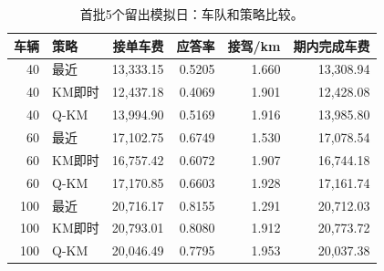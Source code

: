 \begin{table}[htbp]\centering\small
\caption{首批5个留出模拟日：车队和策略比较。}\label{tab:rlfleet}
\begin{tabularx}{\linewidth}{rlrrrr}\toprule
车辆 & 策略 & 接单车费 & 应答率 & 接驾/km & 期内完成车费\\\midrule
40 & 最近 & 13,333.15 & 0.5205 & 1.660 & 13,308.94\\
40 & KM即时 & 12,437.18 & 0.4069 & 1.901 & 12,428.08\\
40 & Q-KM & 13,994.90 & 0.5169 & 1.916 & 13,985.80\\
60 & 最近 & 17,102.75 & 0.6749 & 1.530 & 17,078.54\\
60 & KM即时 & 16,757.42 & 0.6072 & 1.907 & 16,744.18\\
60 & Q-KM & 17,170.85 & 0.6603 & 1.928 & 17,161.74\\
100 & 最近 & 20,716.17 & 0.8155 & 1.291 & 20,712.03\\
100 & KM即时 & 20,793.01 & 0.8080 & 1.912 & 20,773.72\\
100 & Q-KM & 20,046.49 & 0.7795 & 1.953 & 20,037.38\\
\bottomrule\end{tabularx}
\end{table}

